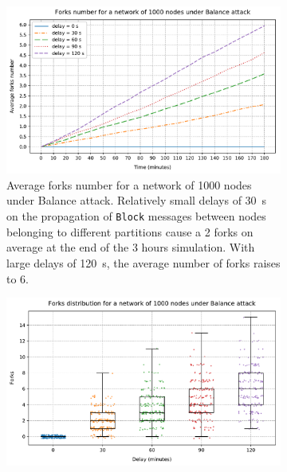 \begin{figure}[ht]
	\begin{subfigure}{\textwidth}
		\centering
		\includegraphics[width=\myplotswitdth \columnwidth]{plots/forks_attack_delay_1000_linechart}
		\vspace*{0.25cm}
		\caption{
			Average forks number for a network of \num{1000} nodes under Balance attack.
			Relatively small delays of \SI{30}{\second} on the propagation of \texttt{Block} messages between nodes belonging to different partitions cause a \num{2} forks on average at the end of the \num{3} hours simulation.
			With large delays of \SI{120}{\second}, the average number of forks raises to \num{6}.
		}
		\vspace*{0.75cm}
	\end{subfigure}
	\begin{subfigure}{\textwidth}
		\centering
		\vspace*{0.25cm}
		\includegraphics[width=\myplotswitdth \columnwidth]{plots/forks_attack_delay_1000_boxplot}

\end{subfigure}
\end{figure}
